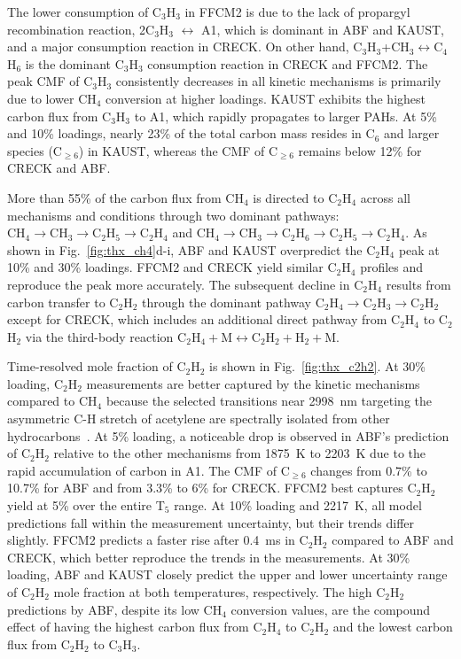 The lower consumption of C$_3$H$_3$ in FFCM2 is due to the lack of propargyl recombination reaction, 2C$_3$H$_3$ $\leftrightarrow$ A1, which is dominant in ABF and KAUST, and a major consumption reaction in CRECK. On other hand,  C$_3$H$_3$+CH$_3$$\leftrightarrow$C$_4$H$_6$ is the dominant C$_3$H$_3$ consumption reaction in CRECK and FFCM2. The peak CMF of C$_3$H$_3$ consistently decreases in all kinetic mechanisms is primarily due to lower CH$_4$ conversion at higher loadings. KAUST exhibits the highest carbon flux from C$_3$H$_3$ to A1, which rapidly propagates to larger PAHs. At 5\% and 10\% loadings, nearly 23\% of the total carbon mass resides in $\mathrm{C_6}$ and larger species ($\mathrm{C_{\ge6}}$) in KAUST, whereas the CMF of $\mathrm{C_{\ge6}}$ remains below 12\% for CRECK and ABF.



More than 55\% of the carbon flux from CH$_4$ is directed to C$_2$H$_4$ across all mechanisms and conditions through two dominant pathways: $\mathrm{CH_4}\rightarrow\mathrm{CH_3}\rightarrow\mathrm{C_2H_5}\rightarrow\mathrm{C_2H_4}$ and $\mathrm{CH_4}\rightarrow\mathrm{CH_3}\rightarrow\mathrm{C_2H_6}\rightarrow\mathrm{C_2H_5}\rightarrow\mathrm{C_2H_4}$.
As shown in Fig.~\ref{fig:thx_ch4}d-i, ABF and KAUST overpredict the C$_2$H$_4$ peak at 10\% and 30\% loadings. FFCM2 and CRECK yield similar C$_2$H$_4$ profiles and reproduce the peak more accurately. The subsequent decline in C$_2$H$_4$ results from carbon transfer to C$_2$H$_2$ through the dominant pathway $\mathrm{C_2H_4}\rightarrow\mathrm{C_2H_3}\rightarrow\mathrm{C_2H_2}$ except for CRECK, which includes an additional direct pathway from C$_2$H$_4$ to C$_2$H$_2$ via the third-body reaction $\mathrm{C_2H_4} + \mathrm{M}\leftrightarrow \mathrm{C_2H_2} + \mathrm{H_2} + \mathrm{M}$.




Time-resolved mole fraction of C$_2$H$_2$ is shown in Fig.~\ref{fig:thx_c2h2}. At 30\% loading, C$_2$H$_2$ measurements are better captured by the kinetic mechanisms compared to CH$_4$ because the selected transitions near 2998~nm targeting the asymmetric C-H stretch of acetylene are spectrally isolated from other hydrocarbons~\citep{jeevaretanam2023transient}.
At 5\% loading, a noticeable drop is observed in ABF's prediction of C$_2$H$_2$ relative to the other mechanisms from 1875~K to 2203~K due to the rapid accumulation of carbon in A1. The CMF of $\mathrm{C_{\ge6}}$ changes from 0.7\% to 10.7\% for ABF and from 3.3\% to 6\% for CRECK. FFCM2 best captures C$_2$H$_2$ yield at 5\% over the entire T$_5$ range. At 10\% loading and 2217~K, all model predictions fall within the measurement uncertainty, but their trends differ slightly. FFCM2 predicts a faster rise after 0.4~ms in C$_2$H$_2$ compared to ABF and CRECK, which better reproduce the trends in the measurements. 
At 30\% loading, ABF and KAUST closely predict the upper and lower uncertainty range of C$_2$H$_2$ mole fraction at both temperatures, respectively. The high C$_2$H$_2$ predictions by ABF, despite its low CH$_4$ conversion values, are the compound effect of having the highest carbon flux from C$_2$H$_4$ to C$_2$H$_2$ and the lowest carbon flux from C$_2$H$_2$ to C$_3$H$_3$.

